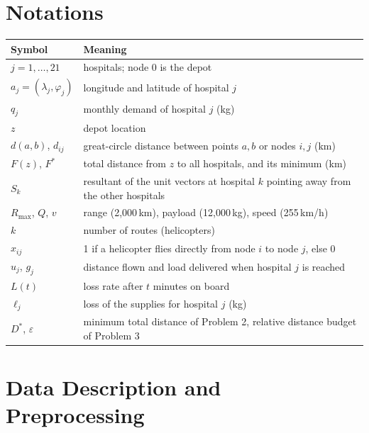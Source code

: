 \documentclass[11pt,a4paper]{article}
\theoremstyle{definition}
\begin{document}
\section{Notations}\label{sec:notation}

\begin{table}[ht]
\centering
\small
\begin{tabular}{ll}
\toprule
Symbol & Meaning \\
\midrule
$j=1,\dots,21$ & hospitals; node 0 is the depot \\
$a_j=(\lambda_j,\varphi_j)$ & longitude and latitude of hospital $j$ \\
$q_j$ & monthly demand of hospital $j$ (kg) \\
$z$ & depot location \\
$d(a,b)$, $d_{ij}$ & great-circle distance between points $a,b$ or nodes $i,j$ (km) \\
$F(z)$, $F^*$ & total distance from $z$ to all hospitals, and its minimum (km) \\
$S_k$ & resultant of the unit vectors at hospital $k$ pointing away from the other hospitals \\
$R_{\max}$, $Q$, $v$ & range (2{,}000\,km), payload (12{,}000\,kg), speed (255\,km/h) \\
$k$ & number of routes (helicopters) \\
$x_{ij}$ & 1 if a helicopter flies directly from node $i$ to node $j$, else 0 \\
$u_j$, $g_j$ & distance flown and load delivered when hospital $j$ is reached \\
$L(t)$ & loss rate after $t$ minutes on board \\
$\ell_j$ & loss of the supplies for hospital $j$ (kg) \\
$D^*$, $\varepsilon$ & minimum total distance of Problem 2, relative distance budget of Problem 3 \\
\bottomrule
\end{tabular}
\end{table}

\section{Data Description and Preprocessing}\label{sec:data}
\end{document}
